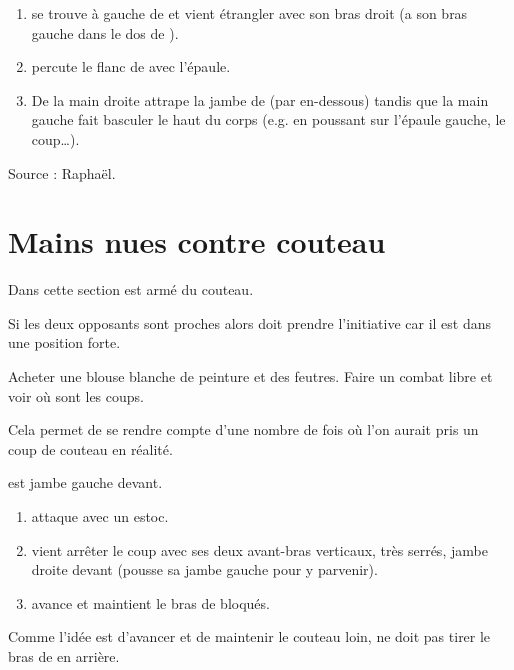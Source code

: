 \begin{technique}

\begin{enumerate}
	\item \A se trouve à gauche de \D et vient étrangler avec son bras droit (\D a son bras gauche dans le dos de \A).
	
	\item \D percute le flanc de \A avec l'épaule.
	
	\item De la main droite \D attrape la jambe de \A (par en-dessous) tandis que la main gauche fait basculer le haut du corps (e.g. en poussant sur l'épaule gauche, le coup…). 
\end{enumerate}

Source : Raphaël.

\end{technique}


\section{Mains nues contre couteau}


Dans cette section \A est armé du couteau.

Si les deux opposants sont proches alors \A doit prendre l'initiative car il est dans une position forte.


\begin{exercice}
Acheter une blouse blanche de peinture et des feutres.
Faire un combat libre et voir où sont les coups.

Cela permet de se rendre compte d'une nombre de fois où l'on aurait pris un coup de couteau en réalité.
\end{exercice}


\begin{exercice}
\label{cc:ex:blocage-estoc}

\D est jambe gauche devant.

\begin{enumerate}
	\item \A attaque \D avec un estoc.
	
	\item \D vient arrêter le coup avec ses deux avant-bras verticaux, très serrés, jambe droite devant (\D pousse sa jambe gauche pour y parvenir).
	
	\item \D avance et maintient le bras de \A bloqués.
\end{enumerate}

Comme l'idée est d'avancer et de maintenir le couteau loin, \D ne doit pas tirer le bras de \A en arrière.

\end{exercice}


